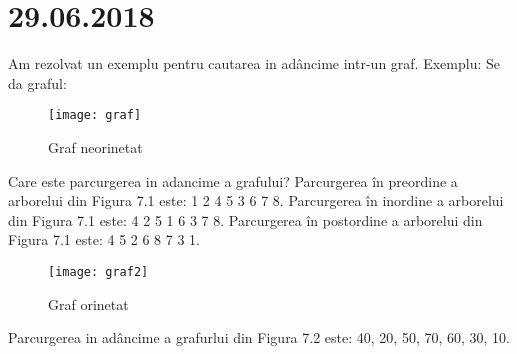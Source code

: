 \documentclass{report}
\begin{document}
\chapter{29.06.2018}
Am rezolvat un exemplu pentru cautarea in adâncime  intr-un graf.
Exemplu: 
Se da graful: \newline
\begin{figure}[ht]
\centering
\texttt{[image: graf]}
\caption{Graf neorinetat}
\end{figure}
Care este parcurgerea in adancime a grafului?\newline
Parcurgerea în preordine a arborelui din Figura 7.1 este: 1 2 4 5 3 6 7 8. \newline
Parcurgerea în inordine a arborelui din Figura 7.1 este: 4 2 5 1 6 3 7 8. \newline
Parcurgerea în postordine a arborelui din Figura 7.1 este: 4 5 2 6 8 7 3 1. 
\begin{figure}[ht]
\centering
\texttt{[image: graf2]}
\caption{Graf orinetat}
\end{figure}
\newline
Parcurgerea in adâncime a grafurlui din Figura 7.2 este: 40, 20, 50, 70, 60, 30, 10.
\end{document}
